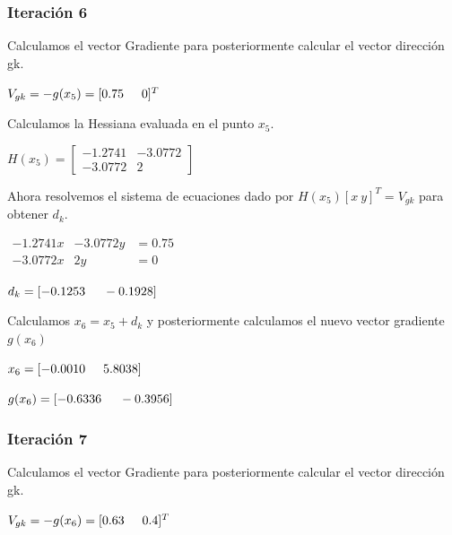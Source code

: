 \documentclass[12pt]{article}
\begin{document}
	
    \subsubsection*{Iteración 6}
	
	Calculamos el vector Gradiente para posteriormente calcular el vector dirección gk.
	
	\begin{center}
		$V_{gk}=-g(x_5)=[0.75 \hspace{0.5cm}0]^T$			
	\end{center}
	
	Calculamos la Hessiana evaluada en el punto $x_5$.
	
	\begin{center}
		$H(x_5)=\left[\begin{array}{cc}
			-1.2741  & -3.0772\\
			-3.0772   & 2
		\end{array}\right]$		
	\end{center}
	
	Ahora resolvemos el sistema de ecuaciones dado por $H(x_5)[x\ y]^T=V_{gk}$ para obtener $d_k$.
	
	\begin{center}
		$\begin{array}{ccc}
			-1.2741x &-3.0772y & =0.75\\
			-3.0772x & 2y & =0
		\end{array}$
		
		$d_k=[-0.1253\hspace{0.5cm}-0.1928]$
	\end{center}	
	
	Calculamos $x_6=x_5+d_k$ y posteriormente calculamos el nuevo vector gradiente $g(x_6)$
	
	\begin{center}
		$x_6=[-0.0010 \hspace{0.5cm}5.8038]$
		
		$g(x_6)=[-0.6336\hspace{0.5cm}-0.3956]$
	\end{center}
	
	
    \subsubsection*{Iteración 7}
	
	Calculamos el vector Gradiente para posteriormente calcular el vector dirección gk.
	
	\begin{center}
		$V_{gk}=-g(x_6)=[0.63 \hspace{0.5cm}0.4]^T$			
	\end{center}
	
\end{document}

